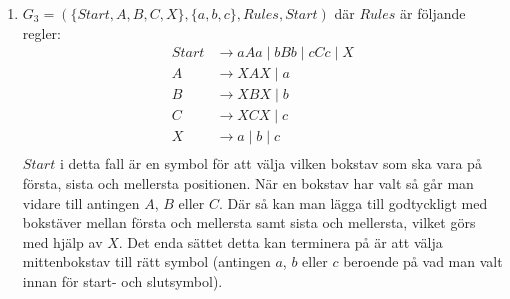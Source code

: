 \documentclass{article}
\begin{document}
\begin{enumerate}[label=(\alph*)]
\item
$G_{3} = (\{Start, A, B, C, X\}, \{a, b, c\}, Rules, Start)$ där $Rules$ är följande regler: 
\begin{align*}
Start & \to aAa \mid bBb \mid cCc  \mid X \\
A & \to XAX \mid a \\
B & \to XBX \mid b \\ 
C & \to XCX \mid c \\ 
X & \to a \mid b \mid c \\ 
\end{align*} 
$Start$ i detta fall är en symbol för att välja vilken bokstav som ska vara på första, sista och mellersta positionen. När en bokstav har valt så går man vidare till antingen $A$, $B$ eller $C$. Där så kan man lägga till godtyckligt med bokstäver mellan första och mellersta samt sista och mellersta, vilket görs med hjälp av $X$. Det enda sättet detta kan terminera på är att välja mittenbokstav till rätt symbol (antingen $a$, $b$ eller $c$ beroende på vad man valt innan för start- och slutsymbol).
\end{enumerate}

\section{}
\end{document}
